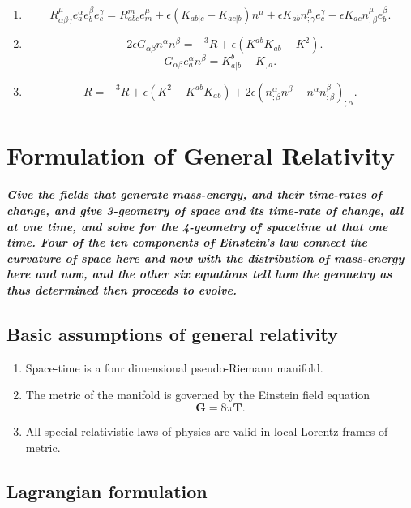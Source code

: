 \begin{newthem}
\begin{enumerate}
\item \[R^{\mu}_{\alpha \beta \gamma} e_a^{\alpha} e_b^{\beta} e_c^{\gamma} = R^m_{abc} e_m^{\mu} + \epsilon (K_{ab|c} - K_{ac|b})n^{\mu} + \epsilon K_{ab} n^{\mu}_{;\gamma}e_c^{\gamma} - \epsilon K_{ac} n^{\mu}_{;\beta}e_b^{\beta}.\]
\item \[-2\epsilon G_{\alpha \beta} n^{\alpha} n^{\beta} = \phantom{R}^3R + \epsilon(K^{ab}K_{ab}-K^2).\]
\[G_{\alpha \beta} e_a^{\alpha}n^{\beta} = K^b_{a|b} - K_{,a}.\]
\item \[R = \phantom{R}^3R + \epsilon(K^2-K^{ab}K_{ab}) + 2\epsilon(n^{\alpha}_{;\beta}n^{\beta}-n^{\alpha}n^{\beta}_{;\beta})_{;\alpha}.\]
\end{enumerate}
\end{newthem}

\chapter{Formulation of General Relativity}
\paragraph*{Give the fields that generate mass-energy, and their time-rates of change, and give 3-geometry of space and its time-rate of change, all at one time, and solve for the 4-geometry of spacetime at that one time. Four of the ten components of Einstein's law connect the curvature of space here and now with the distribution of mass-energy here and now, and the other six equations tell how the geometry as thus determined then proceeds to evolve.}

\section{Basic assumptions of general relativity}
\begin{enumerate}
\item Space-time is a four dimensional pseudo-Riemann manifold.
\item The metric of the manifold is governed by the Einstein field equation
\[\bm{G} = 8\pi\bm{T}.\]
\item  All special relativistic laws of physics are valid in local Lorentz frames of metric.
\end{enumerate}

\section{Lagrangian formulation}

